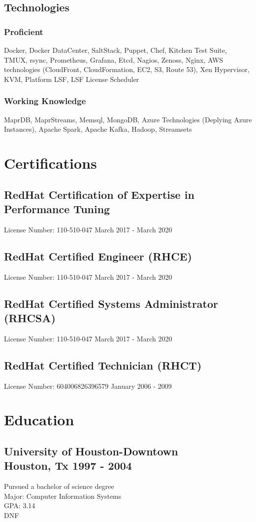 \documentclass{article}
\begin{document}
  \subsection{Technologies}
    \subsubsection{Proficient}
      Docker, Docker DataCenter, SaltStack, Puppet, Chef, Kitchen Test Suite, TMUX, rsync, Prometheus, Grafana, Etcd, Nagios, Zenoss, Nginx, AWS technologies (CloudFront, CloudFormation, EC2, S3, Route 53), Xen Hypervisor, KVM, Platform LSF, LSF License Scheduler
    \subsubsection{Working Knowledge}
      MaprDB, MaprStreams, Memsql, MongoDB, Azure Technologies (Deplying Azure Instances), Apache Spark, Apache Kafka, Hadoop, Streamsets

\section{Certifications}
  \subsection{RedHat Certification of Expertise in Performance Tuning}
    License Number: 110-510-047 \hfill March 2017 - March 2020
  \subsection{RedHat Certified Engineer (RHCE)}
    License Number: 110-510-047 \hfill March 2017 - March 2020
  \subsection{RedHat Certified Systems Administrator (RHCSA)}
    License Number: 110-510-047 \hfill March 2017 - March 2020
  \subsection{RedHat Certified Technician (RHCT)}
    License Number: 604006826396579 \hfill January 2006 - 2009
    
  
\section{Education}
  \subsection{University of Houston-Downtown\\
    Houston, Tx \hfill 1997 - 2004
  }
    \noindent{}Pursued a bachelor of science degree\\
    Major: Computer Information Systems\\
    GPA: 3.14\\
    DNF\\
\end{document}
